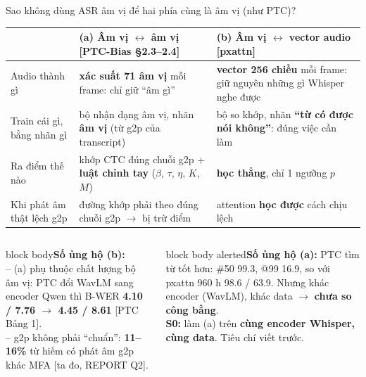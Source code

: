 \documentclass[aspectratio=169,xcolor=table]{beamer}
\newcommand{\hi}[1]{\textcolor{Primary}{\textbf{#1}}}
\newcommand{\bad}[1]{\textcolor{RiskRed}{\textbf{#1}}}
\newcommand{\src}[1]{{\tiny\color{TextGray}[#1]}}
\newcommand{\ra}{$\rightarrow$}
\newcommand{\nbox}[2][block body]{\begin{beamercolorbox}[sep=0.45em,rounded=true]{#1}\footnotesize #2\end{beamercolorbox}}
\begin{document}
\begin{frame}{Sao không dùng ASR âm vị để hai phía cùng là âm vị (như PTC)?}
\centering\scriptsize\setlength{\tabcolsep}{4pt}
\begin{tabular}{L{2.6cm}L{5.4cm}L{5.4cm}}
\toprule
 & \textbf{(a) Âm vị $\leftrightarrow$ âm vị} \src{PTC-Bias §2.3--2.4} & \textbf{(b) Âm vị $\leftrightarrow$ vector audio} \src{pxattn}\\
\midrule
Audio thành gì & \textbf{xác suất 71 âm vị} mỗi frame: chỉ giữ ``âm gì'' & \textbf{vector 256 chiều} mỗi frame: giữ nguyên những gì Whisper nghe được\\
Train cái gì, bằng nhãn gì & bộ nhận dạng âm vị, nhãn \textbf{âm vị} (từ g2p của transcript) & bộ so khớp, nhãn \textbf{``từ có được nói không''}: đúng việc cần làm\\
Ra điểm thế nào & khớp CTC đúng chuỗi g2p + \textbf{luật chỉnh tay} ($\beta$, $\tau$, $\eta$, $K$, $M$) & \textbf{học thẳng}, chỉ 1 ngưỡng $p$\\
Khi phát âm thật lệch g2p & đường khớp phải theo đúng chuỗi g2p \ra{} bị trừ điểm & attention \textbf{học được} cách chịu lệch\\
\bottomrule
\end{tabular}\par
\vspace{0.2cm}\raggedright
\begin{columns}[T]
\begin{column}{0.49\textwidth}
\nbox{\textbf{Số ủng hộ (b):}\\
-- (a) phụ thuộc chất lượng bộ âm vị: PTC đổi WavLM sang encoder Qwen thì B-WER \bad{4.10 / 7.76 \ra{} 4.45 / 8.61} \src{PTC Bảng 1}.\\
-- g2p không phải ``chuẩn'': \textbf{11--16\%} từ hiếm có phát âm g2p khác MFA \src{ta đo, REPORT Q2}.}
\end{column}
\begin{column}{0.49\textwidth}
\nbox[block body alerted]{\textbf{Số ủng hộ (a):} PTC tìm từ tốt hơn: \#50 99.3, @99 16.9, so với pxattn 960 h 98.6 / 63.9. Nhưng khác encoder (WavLM), khác data \ra{} \hi{chưa so công bằng}.\\
\textbf{S0:} làm (a) trên \textbf{cùng encoder Whisper, cùng data}. Tiêu chí viết trước.}
\end{column}
\end{columns}
\end{frame}
\end{document}
